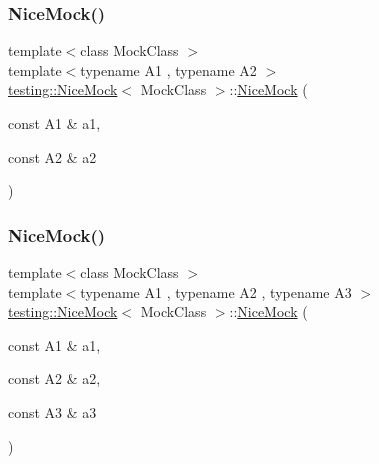 \subsubsection{\texorpdfstring{NiceMock()}{NiceMock()}\hspace{0.1cm}{\footnotesize\ttfamily [9/17]}}
{\footnotesize\ttfamily template$<$class Mock\+Class $>$ \\
template$<$typename A1 , typename A2 $>$ \\
\mbox{\hyperlink{classtesting_1_1_nice_mock}{testing\+::\+Nice\+Mock}}$<$ Mock\+Class $>$\+::\mbox{\hyperlink{classtesting_1_1_nice_mock}{Nice\+Mock}} (\begin{DoxyParamCaption}\item[{const A1 \&}]{a1,  }\item[{const A2 \&}]{a2 }\end{DoxyParamCaption})\hspace{0.3cm}{\ttfamily [inline]}}

\mbox{\label{classtesting_1_1_nice_mock_a0b91bd74b497626bb81d07c3d4b59d22}} 
\subsubsection{\texorpdfstring{NiceMock()}{NiceMock()}\hspace{0.1cm}{\footnotesize\ttfamily [10/17]}}
{\footnotesize\ttfamily template$<$class Mock\+Class $>$ \\
template$<$typename A1 , typename A2 , typename A3 $>$ \\
\mbox{\hyperlink{classtesting_1_1_nice_mock}{testing\+::\+Nice\+Mock}}$<$ Mock\+Class $>$\+::\mbox{\hyperlink{classtesting_1_1_nice_mock}{Nice\+Mock}} (\begin{DoxyParamCaption}\item[{const A1 \&}]{a1,  }\item[{const A2 \&}]{a2,  }\item[{const A3 \&}]{a3 }\end{DoxyParamCaption})\hspace{0.3cm}{\ttfamily [inline]}}

\mbox{\label{classtesting_1_1_nice_mock_a5ffbe1a648f16612266d4e67a2d063d1}} 
